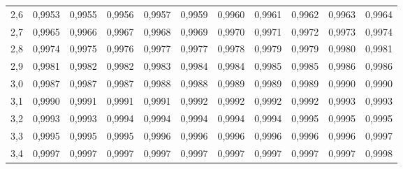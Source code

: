\begin{tabular}{c | c c c c c c c c c c}
    2,6     & 0,9953        & 0,9955        & 0,9956        & 0,9957        & 0,9959        & 0,9960& 0,9961 & 0,9962        & 0,9963        & 0,9964 \\
    2,7     & 0,9965        & 0,9966        & 0,9967        & 0,9968        & 0,9969        & 0,9970& 0,9971 & 0,9972        & 0,9973        & 0,9974 \\
    2,8     & 0,9974        & 0,9975        & 0,9976        & 0,9977        & 0,9977        & 0,9978& 0,9979 & 0,9979        & 0,9980        & 0,9981 \\
    2,9     & 0,9981        & 0,9982        & 0,9982        & 0,9983        & 0,9984        & 0,9984& 0,9985 & 0,9985        & 0,9986        & 0,9986 \\
    3,0     & 0,9987        & 0,9987        & 0,9987        & 0,9988        & 0,9988        & 0,9989& 0,9989 & 0,9989        & 0,9990        & 0,9990 \\
    3,1     & 0,9990        & 0,9991        & 0,9991        & 0,9991        & 0,9992        & 0,9992& 0,9992 & 0,9992        & 0,9993        & 0,9993 \\
    3,2     & 0,9993        & 0,9993        & 0,9994        & 0,9994        & 0,9994        & 0,9994& 0,9994 & 0,9995        & 0,9995        & 0,9995 \\
    3,3     & 0,9995        & 0,9995        & 0,9995        & 0,9996        & 0,9996        & 0,9996& 0,9996 & 0,9996        & 0,9996        & 0,9997 \\
    3,4     & 0,9997        & 0,9997        & 0,9997        & 0,9997        & 0,9997        & 0,9997& 0,9997 & 0,9997        & 0,9997        & 0,9998 \\
\end{tabular} 